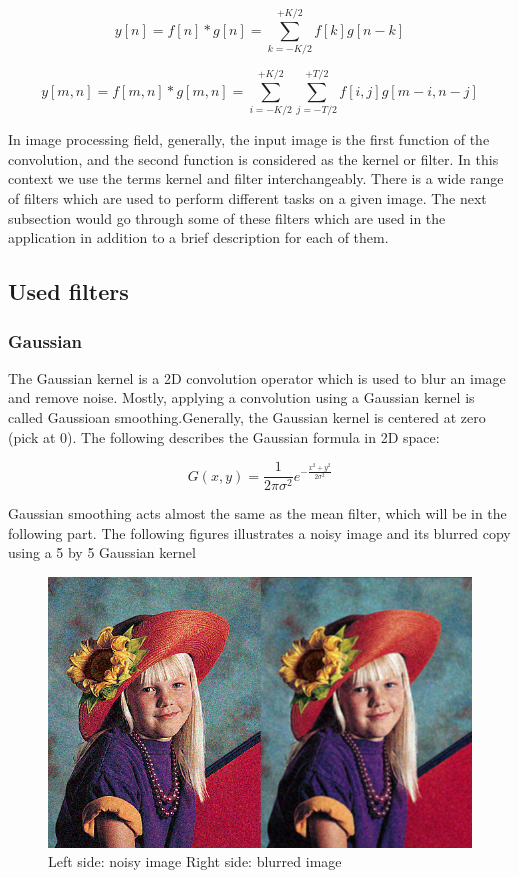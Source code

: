 \documentclass{article}
\begin{document}
			\[y[n] = f[n]*g[n] = \sum_{k=-K/2}^{+K/2} f[k]g[n-k]\]

			\[y[m,n] = f[m,n]*g[m,n] = \sum_{i=-K/2}^{+K/2}\sum_{j=-T/2}^{+T/2}f[i,j]g[m-i,n-j]\]



			
			
			In image processing field, generally, the input image is the first function of the convolution, and the second 
			function is considered as the kernel or filter.
			In this context we use the terms kernel and filter interchangeably.
			There is a wide range of filters which are used to perform different tasks on a given image. The next subsection would go through some of these 
			filters which are used in the application in addition to a brief description for each of them.

		\subsection{Used filters}
		
		\subsubsection{Gaussian}

			The Gaussian kernel is a 2D convolution operator which is used to blur an image and remove noise. Mostly, applying a convolution using a Gaussian
			kernel is called Gaussioan smoothing.Generally, the Gaussian kernel is centered at
			zero (pick at 0). The following describes the Gaussian formula in 2D space:

			\[G(x,y) = \frac{1}{2\pi\sigma^{2}}e^{-\frac{x^{2}+y^{2}}{2\sigma^{2}}}\]

			
			Gaussian smoothing acts almost the same as the mean filter, which will be in the following part. The following figures illustrates a noisy image and its blurred copy using a 5 by 5 Gaussian kernel

	\begin{figure} [H]
		\centering
		\includegraphics[scale=.3]{images/noisy_removed}
		\caption{Left side: noisy image Right side: blurred image \label{crop_1}}
	\end{figure}
\end{document}
